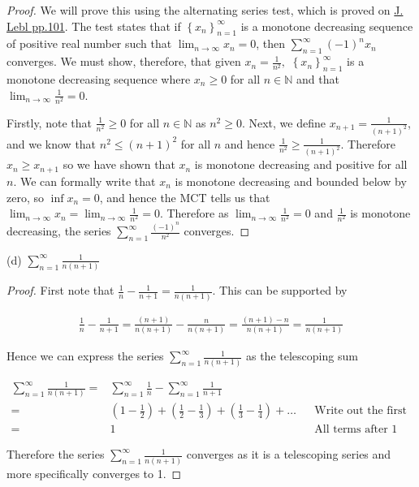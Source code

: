\documentclass[12pt]{article}
\newcommand{\limtoinf}[1][n]{\displaystyle\lim_{ {#1} \to \infty}}
\newcommand{\seq}[2][n]{\left\{ {#2} \right\}_{#1=1}^\infty}
\newcommand{\paren}[1]{\left( {#1} \right)}
\newcommand{\series}[2]{\displaystyle \sum_{ {#1} }^{ {#2} }}
\newcommand{\bN}{\mathbb{N}}
\begin{document}
\begin{proof}
	We will prove this using the alternating series test, which is proved on \underline{J. Lebl pp.101}. The test states that if $\seq{x_n}$ is a monotone decreasing sequence of positive real number such that $\limtoinf x_n=0$, then $\series{n=1}{\infty}(-1)^nx_n$ converges. We must show, therefore, that given $x_n=\frac{1}{n^2},$ $\seq{x_n}$ is a monotone decreasing sequence where $x_n\ge 0$ for all $n\in\bN$ and that $\limtoinf\frac{1}{n^2}=0$. 
	
	Firstly, note that $\frac{1}{n^2}\ge0$ for all $n\in\bN$ as $n^2\ge0$. Next, we define $x_{n+1}=\frac{1}{(n+1)^2}$, and we know that $n^2\le(n+1)^2$ for all $n$ and hence $\frac{1}{n^2}\ge\frac{1}{(n+1)^2}$. Therefore $x_n\ge x_{n+1}$ so we have shown that $x_n$ is monotone decreasing and positive for all $n$. We can formally write that $x_n$ is monotone decreasing and bounded below by zero, so $\inf x_n = 0$, and hence the MCT tells us that $\limtoinf x_n=\limtoinf\frac{1}{n^2}=0$. Therefore as $\limtoinf\frac{1}{n^2}=0$ and $\frac{1}{n^2}$ is monotone decreasing, the series $\series{n=1}{\infty}\frac{(-1)^n}{n^2}$ converges.
\end{proof}

\noindent (d) $\series{n=1}{\infty}\frac{1}{n(n+1)}$

\begin{proof}
	First note that $\frac{1}{n}-\frac{1}{n+1}=\frac{1}{n(n+1)}$. This can be supported by
	
\begin{align*}
	\frac{1}{n}-\frac{1}{n+1}=\frac{(n+1)}{n(n+1)}-\frac{n}{n(n+1)}=\frac{(n+1)-n}{n(n+1)}=\frac{1}{n(n+1)}
\end{align*}

\noindent Hence we can express the series $\series{n=1}{\infty}\frac{1}{n(n+1)}$ as the telescoping sum

\begin{align*}
	\series{n=1}{\infty}\frac{1}{n(n+1)}=&\series{n=1}{\infty}\frac{1}{n}-\series{n=1}{\infty}\frac{1}{n+1} \\
	=&\paren{1-\frac{1}{2}}+\paren{\frac{1}{2}-\frac{1}{3}}+\paren{\frac{1}{3}-\frac{1}{4}}+\dots && \text{Write out the first few terms} \\
	=&1 && \text{All terms after 1 cancel out}
\end{align*}

	Therefore the series $\series{n=1}{\infty}\frac{1}{n(n+1)}$ converges as it is a telescoping series and more specifically converges to 1.

\end{proof}
\end{document}
